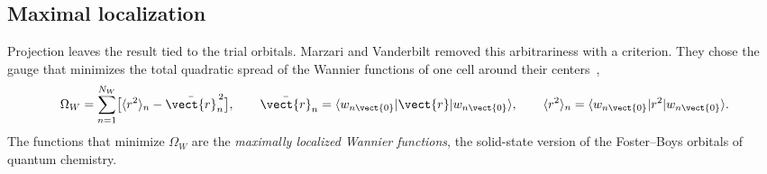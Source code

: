 \subsection{Maximal localization}

Projection leaves the result tied to the trial orbitals. Marzari and Vanderbilt removed this arbitrariness with a criterion. They chose the gauge that minimizes the total quadratic spread of the Wannier functions of one cell around their centers~\cite[Eq.~(11)]{marzari1997maximally},
\begin{equation}
  \Omega_W = \sum_{n=1}^{N_W}\bigl[\langle r^2\rangle_n - \bar{\vect{r}}_n^{\,2}\bigr], \qquad
  \bar{\vect{r}}_n = \langle w_{n\vect{0}}|\vect{r}|w_{n\vect{0}}\rangle, \qquad
  \langle r^2\rangle_n = \langle w_{n\vect{0}}|r^2|w_{n\vect{0}}\rangle .
  \label{eq:3.6-spread}
\end{equation}
The functions that minimize $\Omega_W$ are the \emph{maximally localized Wannier functions}, the solid-state version of the Foster--Boys orbitals of quantum chemistry.


